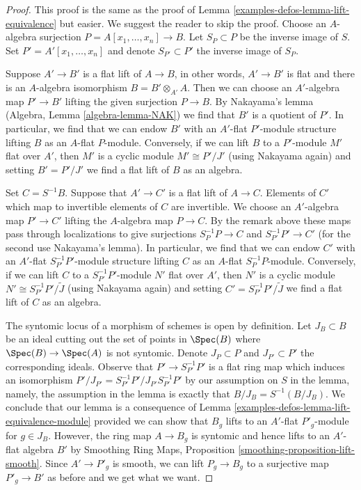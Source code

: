 \begin{proof}
This proof is the same as the proof of
Lemma \ref{examples-defos-lemma-lift-equivalence} but easier. We suggest the
reader to skip the proof.
Choose an $A$-algebra surjection $P = A[x_1, \ldots, x_n] \to B$.
Let $S_P \subset P$ be the inverse image of $S$.
Set $P' = A'[x_1, \ldots, x_n]$ and denote $S_{P'} \subset P'$
the inverse image of $S_P$.

\medskip\noindent
Suppose $A' \to B'$ is a flat lift of $A \to B$, in other words,
$A' \to B'$ is flat and there is an $A$-algebra isomorphism
$B = B' \otimes_{A'} A$. Then we can choose an $A'$-algebra map
$P' \to B'$ lifting the given surjection $P \to B$.
By Nakayama's lemma (Algebra, Lemma \ref{algebra-lemma-NAK})
we find that $B'$ is a quotient of $P'$. In particular, we find
that we can endow $B'$ with an $A'$-flat $P'$-module structure
lifting $B$ as an $A$-flat $P$-module.
Conversely, if we can lift $B$ to a $P'$-module $M'$ flat over $A'$,
then $M'$ is a cyclic module $M' \cong P'/J'$ (using Nakayama again)
and setting $B' = P'/J'$ we find a flat lift of $B$ as an algebra.

\medskip\noindent
Set $C = S^{-1}B$. Suppose that $A' \to C'$ is a flat lift of $A \to C$.
Elements of $C'$ which map to invertible elements of $C$ are invertible.
We choose an $A'$-algebra map $P' \to C'$ lifting
the $A$-algebra map $P \to C$. By the remark above
these maps pass through localizations to give surjections
$S_P^{-1}P \to C$ and $S_{P'}^{-1}P' \to C'$
(for the second use Nakayama's lemma).
In particular, we find that we can endow $C'$ with an $A'$-flat
$S_{P'}^{-1}P'$-module structure lifting $C$ as an $A$-flat
$S_P^{-1}P$-module. Conversely, if we can lift $C$ to a
$S_{P'}^{-1}P'$-module $N'$ flat over $A'$, then $N'$
is a cyclic module $N' \cong S_{P'}^{-1}P'/\tilde J$
(using Nakayama again) and setting $C' = S_{P'}^{-1}P'/\tilde J$
we find a flat lift of $C$ as an algebra.

\medskip\noindent
The syntomic locus of a morphism of schemes is open by definition.
Let $J_B \subset B$ be an ideal cutting out the set of points
in $\Spec(B)$ where $\Spec(B) \to \Spec(A)$ is not syntomic.
Denote $J_P \subset P$ and $J_{P'} \subset P'$ the corresponding
ideals. Observe that $P' \to S_{P'}^{-1}P'$ is a flat ring map which
induces an isomorphism $P'/J_{P'} = S_{P'}^{-1}P'/J_{P'}S_{P'}^{-1}P'$
by our assumption on $S$ in the lemma, namely, the assumption
in the lemma is exactly that $B/J_B = S^{-1}(B/J_B)$.
We conclude that our lemma is a consequence of
Lemma \ref{examples-defos-lemma-lift-equivalence-module} provided we can
show that $B_g$ lifts to an $A'$-flat $P'_g$-module for
$g \in J_B$. However, the ring map $A \to B_g$ is syntomic
and hence lifts to an $A'$-flat algebra $B'$ by
Smoothing Ring Maps, Proposition \ref{smoothing-proposition-lift-smooth}.
Since $A' \to P'_g$ is smooth, we can lift $P_g \to B_g$
to a surjective map $P'_g \to B'$ as before and we get what we want.
\end{proof}

